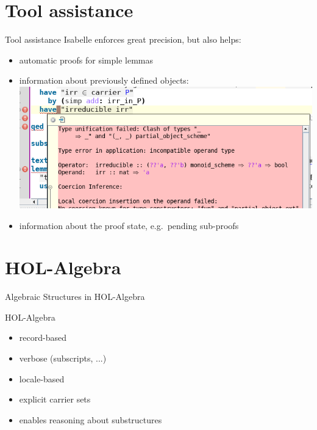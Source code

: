 \documentclass[%
	sans,
	12pt,
]{beamer}
\newcommand{\high}[1]{{\usebeamercolor[fg]{structure} #1}}
\begin{document}
\section{Tool assistance}
\begin{frame}{Tool assistance}%
Isabelle enforces great precision, but also helps:
\begin{itemize}
	\item automatic proofs for simple lemmas\pause %
	\item information about previously defined objects: \pause
	\includegraphics[width=0.7\linewidth]{"type_error"} \pause
	\item information about the proof state, e.g.\ pending sub-proofs
\end{itemize}
\end{frame}

\section{HOL-Algebra}
\begin{frame}
\begin{center}
\huge\high{Algebraic Structures in HOL-Algebra}%
\end{center}
\end{frame}

\begin{frame}{HOL-Algebra}
\begin{itemize}
	\item record-based \pause%
	\item verbose (subscripts, ...) \pause%
	\item locale-based \pause%
	\item explicit carrier sets \pause
	\item enables reasoning about substructures	\pause%
\end{itemize}
\end{frame}
\end{document}
